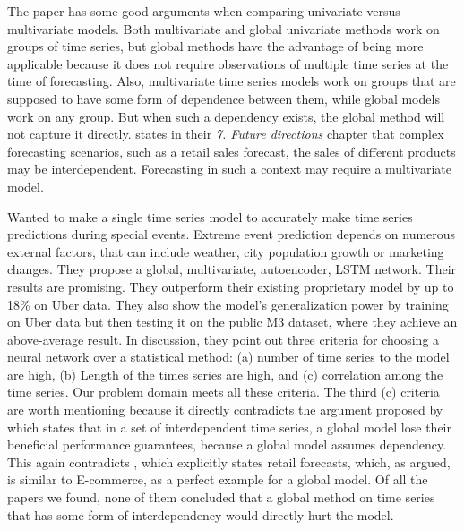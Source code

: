 The paper \cite{Rabanser2020} has some good arguments when comparing univariate versus multivariate models.
Both multivariate and global univariate methods work on groups of time series, but global methods
have the advantage of being more applicable because it does not require observations of multiple
time series at the time of forecasting.
Also, multivariate time series models work on groups that are supposed to have some form of 
dependence between them, while global models work on any group.
But when such a dependency exists, the global method will not capture it directly.
\cite{Hewamalage2021} states in their \textit{7. Future directions} chapter that complex
forecasting scenarios, such as a retail sales forecast, the sales of different products
may be interdependent.
Forecasting in such a context may require a multivariate model.

\cite{Laptev}
Wanted to make a single time series model to
accurately make time series predictions during special events.
Extreme event prediction depends on numerous external factors,
that can include weather, city population growth or marketing
changes.
They propose a global, multivariate, autoencoder, LSTM network.
Their results are promising. They outperform their existing
proprietary model by up to 18\% on Uber data.
They also show the model's generalization power by training on Uber data
but then testing it on the public M3 dataset, where they achieve an above-average result.
In \cite{Laptev} discussion, they point out three criteria for 
choosing a neural network over a statistical method:
(a) number of time series to the model are high, (b) Length of the 
times series are high, and (c) correlation among the time series.
Our problem domain meets all these criteria. 
The third (c) criteria are worth mentioning because it directly
contradicts the argument proposed by \cite{Montero-Manso2021}%
which states that in a set of interdependent time series,
a global model lose their beneficial performance guarantees,
because a global model assumes dependency.
This again contradicts \cite{Hewamalage2021}, which explicitly states
retail forecasts, which, as argued, is similar to E-commerce,
as a perfect example for a global model.
Of all the papers we found, none of them concluded that a global method
on time series that has some form of interdependency would directly hurt the model.




